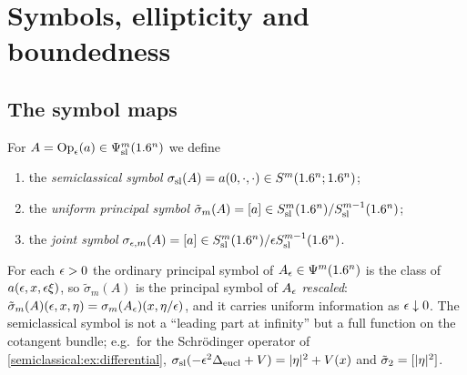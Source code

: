 \section{Symbols, ellipticity and boundedness}\label{semiclassical:sec:symbol-maps}

\subsection{The symbol maps}
\begin{definition}\label{semiclassical:def:symbol-maps}
  For $A=\operatorname{Op}_\epsilon(a)\in\Psi^{m}_{\mathrm{sl}}(1.6^n)$ we define
  \begin{enumerate}[label=\textup{(\roman*)}]
  \item the \emph{semiclassical symbol} $\sigma_{\mathrm{sl}}(A)=a(0,\cdot,\cdot)\in S^m(1.6^n;1.6^n)$;
  \item the \emph{uniform principal symbol}
    $\tilde\sigma_m(A)=[a]\in S^{m}_{\mathrm{sl}}(1.6^n)/S^{m-1}_{\mathrm{sl}}(1.6^n)$;
  \item the \emph{joint symbol} $\sigma_{\epsilon,m}(A)=[a]\in S^{m}_{\mathrm{sl}}(1.6^n)/\epsilon S^{m-1}_{\mathrm{sl}}(1.6^n)$.
  \end{enumerate}
\end{definition}

For each $\epsilon>0$ the ordinary principal symbol of $A_\epsilon\in\Psi^{m}(1.6^n)$ is the
class of $a(\epsilon,x,\epsilon\xi)$, so $\tilde\sigma_m(A)$ is the principal symbol of
$A_\epsilon$ \emph{rescaled}: $\tilde\sigma_m(A)(\epsilon,x,\eta)=\sigma_m(A_\epsilon)(x,\eta/\epsilon)$,
and it carries uniform information as $\epsilon\downarrow0$. The semiclassical
symbol is not a ``leading part at infinity'' but a full function on the
cotangent bundle; e.g.\ for the Schr\"odinger operator of
\cref{semiclassical:ex:differential}, $\sigma_{\mathrm{sl}}(-\epsilon^2\Delta_{\mathrm{eucl}}+V)=\lvert \eta\rvert^2+V(x)$
and $\tilde\sigma_2=[\lvert \eta\rvert^2]$.

